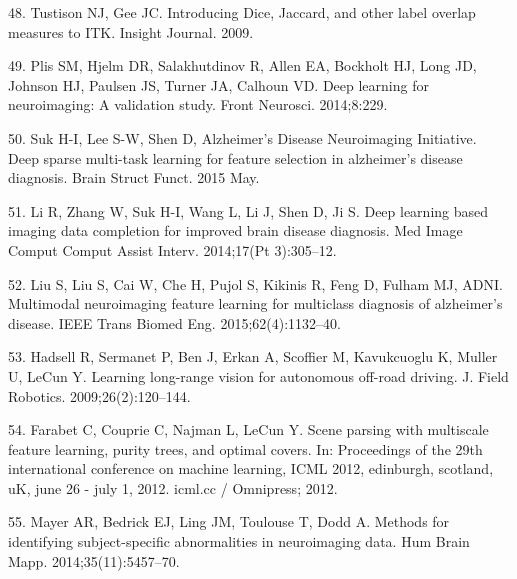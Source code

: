 \documentclass[11pt,]{article}
\begin{document}
\hypertarget{ref-tustison2009}{}
48. Tustison NJ, Gee JC. Introducing Dice, Jaccard, and other label
overlap measures to ITK. Insight Journal. 2009.

\hypertarget{ref-Plis:2014aa}{}
49. Plis SM, Hjelm DR, Salakhutdinov R, Allen EA, Bockholt HJ, Long JD,
Johnson HJ, Paulsen JS, Turner JA, Calhoun VD. Deep learning for
neuroimaging: A validation study. Front Neurosci. 2014;8:229.

\hypertarget{ref-Suk:2015aa}{}
50. Suk H-I, Lee S-W, Shen D, Alzheimer's Disease Neuroimaging
Initiative. Deep sparse multi-task learning for feature selection in
alzheimer's disease diagnosis. Brain Struct Funct. 2015 May.

\hypertarget{ref-Li:2014aa}{}
51. Li R, Zhang W, Suk H-I, Wang L, Li J, Shen D, Ji S. Deep learning
based imaging data completion for improved brain disease diagnosis. Med
Image Comput Comput Assist Interv. 2014;17(Pt 3):305--12.

\hypertarget{ref-Liu:2015aa}{}
52. Liu S, Liu S, Cai W, Che H, Pujol S, Kikinis R, Feng D, Fulham MJ,
ADNI. Multimodal neuroimaging feature learning for multiclass diagnosis
of alzheimer's disease. IEEE Trans Biomed Eng. 2015;62(4):1132--40.

\hypertarget{ref-HadsellSBESKML09}{}
53. Hadsell R, Sermanet P, Ben J, Erkan A, Scoffier M, Kavukcuoglu K,
Muller U, LeCun Y. Learning long-range vision for autonomous off-road
driving. J. Field Robotics. 2009;26(2):120--144.

\hypertarget{ref-FarabetCNL12}{}
54. Farabet C, Couprie C, Najman L, LeCun Y. Scene parsing with
multiscale feature learning, purity trees, and optimal covers. In:
Proceedings of the 29th international conference on machine learning,
ICML 2012, edinburgh, scotland, uK, june 26 - july 1, 2012. icml.cc /
Omnipress; 2012.

\hypertarget{ref-Mayer:2014aa}{}
55. Mayer AR, Bedrick EJ, Ling JM, Toulouse T, Dodd A. Methods for
identifying subject-specific abnormalities in neuroimaging data. Hum
Brain Mapp. 2014;35(11):5457--70.
\end{document}
